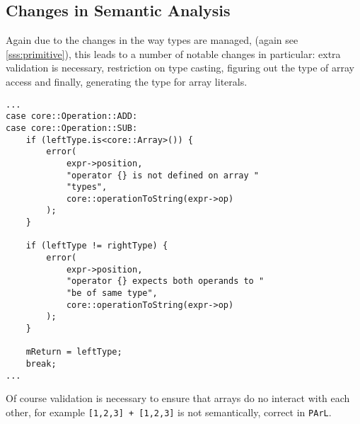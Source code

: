 \subsection{Changes in Semantic Analysis}

Again due to the changes in the way types are managed, (again
see \ref{sss:primitive}), this leads to a number of notable
changes in particular: extra validation is necessary,
restriction on type casting, figuring out the type of array
access and finally, generating the type for array literals.

\begin{lstlisting}[caption={A part of the \texttt{visit(Binary
*)} method in the \texttt{AnalysisVisitor} class
(analysis/AnalysisVisitor.cpp)}]
...
case core::Operation::ADD:
case core::Operation::SUB:
    if (leftType.is<core::Array>()) {
        error(
            expr->position,
            "operator {} is not defined on array "
            "types",
            core::operationToString(expr->op)
        );
    }

    if (leftType != rightType) {
        error(
            expr->position,
            "operator {} expects both operands to "
            "be of same type",
            core::operationToString(expr->op)
        );
    }

    mReturn = leftType;
    break;
...
\end{lstlisting}

Of course validation is necessary to ensure that arrays do no
interact with each other, for example \texttt{[1,2,3] + [1,2,3]}
is not semantically, correct in \texttt{PArL}.

